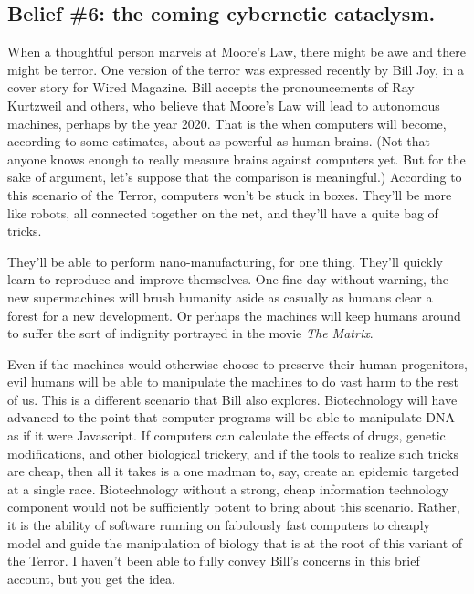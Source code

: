\documentclass[letterpaper,12pt,english]{sphinxmanual}
\begin{document}
\subsection{Belief \#6: \textbf{the coming cybernetic cataclysm}.}
\label{lanier:belief-6-the-coming-cybernetic-cataclysm}
When a thoughtful person marvels at Moore's Law, there might be awe and there might be terror. One version of the terror was expressed recently by Bill Joy, in a cover story for Wired Magazine. Bill accepts the pronouncements of Ray Kurtzweil and others, who believe that Moore's Law will lead to autonomous machines, perhaps by the year 2020. That is the when computers will become, according to some estimates, about as powerful as human brains. (Not that anyone knows enough to really measure brains against computers yet. But for the sake of argument, let's suppose that the comparison is meaningful.) According to this scenario of the Terror, computers won't be stuck in boxes. They'll be more like robots, all connected together on the net, and they'll have a quite bag of tricks.

They'll be able to perform nano-manufacturing, for one thing. They'll quickly learn to reproduce and improve themselves. One fine day without warning, the new supermachines will brush humanity aside as casually as humans clear a forest for a new development. Or perhaps the machines will keep humans around to suffer the sort of indignity portrayed in the movie \emph{The Matrix}.

Even if the machines would otherwise choose to preserve their human progenitors, evil humans will be able to manipulate the machines to do vast harm to the rest of us. This is a different scenario that Bill also explores. Biotechnology will have advanced to the point that computer programs will be able to manipulate DNA as if it were Javascript. If computers can calculate the effects of drugs, genetic modifications, and other biological trickery, and if the tools to realize such tricks are cheap, then all it takes is a one madman to, say, create an epidemic targeted at a single race. Biotechnology without a strong, cheap information technology component would not be sufficiently potent to bring about this scenario. Rather, it is the ability of software running on fabulously fast computers to cheaply model and guide the manipulation of biology that is at the root of this variant of the Terror. I haven't been able to fully convey Bill's concerns in this brief account, but you get the idea.
\end{document}
